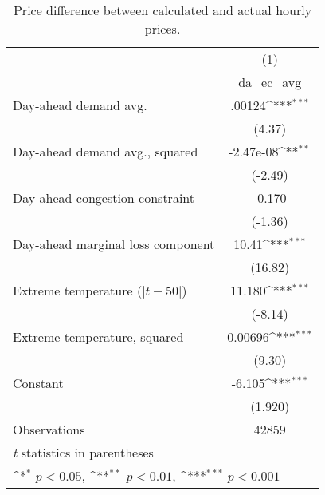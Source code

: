 \begin{table}[htbp]\centering
\def\sym#1{\ifmmode^{#1}\else\(^{#1}\)\fi}
\caption{Price difference between calculated and actual hourly prices.\label{tab1}}
\begin{tabular}{l*{1}{c}}
\hline\hline
                    &\multicolumn{1}{c}{(1)}\\
                    &\multicolumn{1}{c}{da\_ec\_avg}\\
\hline
Day-ahead demand avg.             &       .00124\sym{***}\\
                    &     (4.37)         \\
[1em]
Day-ahead demand avg., squared            &      -2.47e-08\sym{**}         \\
                    &     (-2.49)         \\
[1em]
Day-ahead congestion constraint           &      -0.170         \\
                    &     (-1.36)         \\
[1em]
Day-ahead marginal loss component              &       10.41\sym{***}\\
                    &     (16.82)         \\
[1em]
Extreme temperature ($|t-50|$)            &      11.180\sym{***}         \\
                    &     (-8.14)         \\
[1em]
Extreme temperature, squared             &      0.00696\sym{***}         \\
                    &     (9.30)         \\
Constant            &       -6.105\sym{***} \\
                    &      (1.920)         \\
\hline
Observations        &        42859         \\
\hline\hline
\multicolumn{2}{l}{\footnotesize \textit{t} statistics in parentheses}\\
\multicolumn{2}{l}{\footnotesize \sym{*} \(p<0.05\), \sym{**} \(p<0.01\), \sym{***} \(p<0.001\)}\\
\end{tabular}
\end{table}
